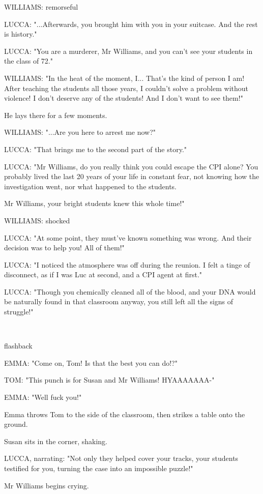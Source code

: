 \documentclass[11pt]{article}
\begin{document}
WILLIAMS: remorseful

LUCCA: "...Afterwards, you brought him with you in your suitcase.
And the rest is history."

LUCCA: "You are a murderer, Mr Williams, and you can't see your students in the class of 72."

WILLIAMS: "In the heat of the moment, I...
That's the kind of person I am!
After teaching the students all those years, I couldn't solve a problem without violence!
I don't deserve any of the students!
And I don't want to see them!"

He lays there for a few moments. 

WILLIAMS: "...Are you here to arrest me now?"

LUCCA: "That brings me to the second part of the story."

LUCCA: "Mr Williams, do you really think you could escape the CPI alone?
You probably lived the last 20 years of your life in constant fear, not knowing how the investigation went, nor what happened to the students.

Mr Williams, your bright students knew this whole time!"

WILLIAMS: shocked

LUCCA: "At some point, they must've known something was wrong. 
And their decision was to help you! All of them!"

LUCCA: "I noticed the atmosphere was off during the reunion.
I felt a tinge of disconnect, as if I was Luc at second, and a CPI agent at first."

LUCCA: "Though you chemically cleaned all of the blood, and your DNA would be naturally found in that classroom anyway, you still left all the signs of struggle!"

\ 

flashback

EMMA: "Come on, Tom! Is that the best you can do!?"

TOM: "This punch is for Susan and Mr Williams! HYAAAAAAA-"

EMMA: "Well fuck you!"

Emma throws Tom to the side of the classroom, then strikes a table onto the ground.

Susan sits in the corner, shaking.

LUCCA, narrating: "Not only they helped cover your tracks, your students testified for you, turning the case into an impossible puzzle!"

Mr Williams begins crying.
\end{document}
